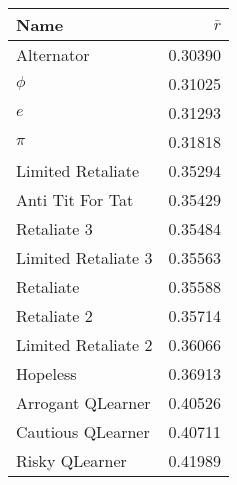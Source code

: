 \begin{tabular}{lr}
\toprule
Name                &                         $\bar{r}$    \\
\midrule
Alternator          &                                 0.30390 \\
$\phi$              &                                 0.31025 \\
$e$                 &                                 0.31293 \\
$\pi$               &                                 0.31818 \\
Limited Retaliate   &                                 0.35294 \\
Anti Tit For Tat    &                                 0.35429 \\
Retaliate 3         &                                 0.35484 \\
Limited Retaliate 3 &                                 0.35563 \\
Retaliate           &                                 0.35588 \\
Retaliate 2         &                                 0.35714 \\
Limited Retaliate 2 &                                 0.36066 \\
Hopeless            &                                 0.36913 \\
Arrogant QLearner   &                                 0.40526 \\
Cautious QLearner   &                                 0.40711 \\
Risky QLearner      &                                 0.41989 \\
\bottomrule
\end{tabular}
